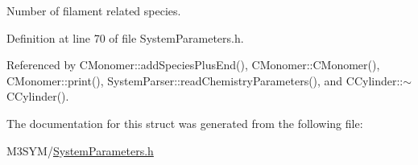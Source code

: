 Number of filament related species. 



Definition at line 70 of file System\+Parameters.\+h.



Referenced by C\+Monomer\+::add\+Species\+Plus\+End(), C\+Monomer\+::\+C\+Monomer(), C\+Monomer\+::print(), System\+Parser\+::read\+Chemistry\+Parameters(), and C\+Cylinder\+::$\sim$\+C\+Cylinder().



The documentation for this struct was generated from the following file\+:\begin{DoxyCompactItemize}
\item 
M3\+S\+Y\+M/\hyperlink{SystemParameters_8h}{System\+Parameters.\+h}\end{DoxyCompactItemize}
